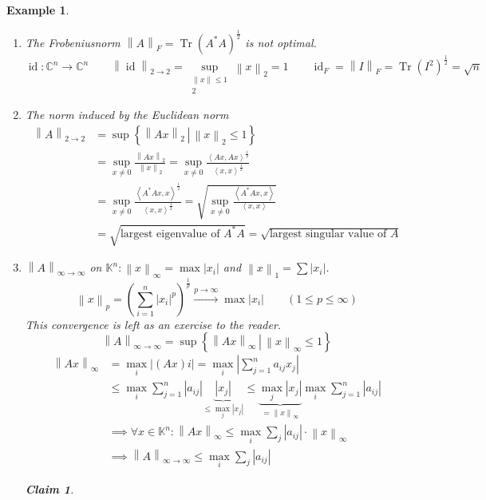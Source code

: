 \documentclass[a4paper]{article}
\newcounter{lecref}[section]
\numberwithin{lecref}{section}
\newtheorem{example}[lecref]{Example}
\newtheorem*{claim}{Claim}
\newcommand{\setdef}[2]{\left\{\left.#1\,\right|\,#2\right\}}
\newcommand{\angel}[1]{\left\langle#1\right\rangle}
\newcommand{\norm}[1]{\left\|#1\right\|}
\newcommand{\card}[1]{\left|#1\right|}
\begin{document}
\begin{example} %
  \begin{enumerate}
    \item The Frobeniusnorm $\norm{A}_F = \operatorname{Tr}(A^* A)^{\frac12}$ is not optimal.
      \[
        \operatorname{id}: \mathbb C^n \to \mathbb C^n \qquad
        \norm{\operatorname{id}}_{2 \to 2} = \sup_{\substack{\norm{x} \leq 1 \\ 2}} \norm{x}_2 = 1 \qquad
        \operatorname{id}_F = \norm{I}_F = \operatorname{Tr}(I^2)^{\frac12} = \sqrt n
      \]
    \item The norm induced by the Euclidean norm
      \begin{align*}
        \norm{A}_{2 \to 2} &= \sup\setdef{\norm{Ax}_2}{\norm{x}_2 \leq 1} \\
          &= \sup_{x \neq 0} \frac{\norm{Ax}_2}{\norm{x}_2} = \sup_{x \neq 0} \frac{\angel{Ax, Ax}^{\frac12}}{\angel{x,x}^{\frac12}} \\
          &= \sup_{x \neq 0} \frac{\angel{A^* Ax, x}^{\frac12}}{\angel{x,x}^{\frac12}} = \sqrt{\sup_{x \neq 0} \frac{\angel{A^* Ax, x}}{\angel{x,x}}} \\
          &= \sqrt{\text{largest eigenvalue of } A^* A} = \sqrt{\text{largest singular value of } A}
      \end{align*}
    \item
      $\norm{A}_{\infty\to\infty}$ on $\mathbb K^n: \norm{x}_{\infty} = \max \card{x_i}$ and $\norm{x}_1 = \sum \card{x_i}$.
      \[ \norm{x}_p = \left(\sum_{i=1}^n \card{x_i}^p\right)^{\frac1p} \xrightarrow{p \to \infty} \max \card{x_i} \qquad (1 \leq p \leq \infty) \]
      This convergence is left as an exercise to the reader.
      \[ \norm{A}_{\infty\to\infty} = \sup\setdef{\norm{Ax}_{\infty}}{\norm{x}_\infty \leq 1} \]
      \begin{align*}
        \norm{Ax}_{\infty} &= \max_i \card{(Ax) i} = \max_i \card{\sum_{j=1}^n a_{ij} x_j} \\
          &\leq \max_i \sum_{j=1}^n \card{a_{ij}} \underbrace{\card{x_j}}_{\leq \max_j \card{x_j}}
           \leq \underbrace{\max_j \card{x_j}}_{= \norm{x}_{\infty}} \max_i \sum_{j=1}^n \card{a_{ij}} \\
          &\implies \forall x \in \mathbb K^n: \norm{Ax}_{\infty} \leq \max_i \sum_j \card{a_{ij}} \cdot \norm{x}_{\infty} \\
          &\implies \norm{A}_{\infty\to\infty} \leq \max_i \sum_j \card{a_{ij}}
      \end{align*}
      \begin{claim}

\end{claim}
\end{enumerate}
\end{example}
\end{document}
